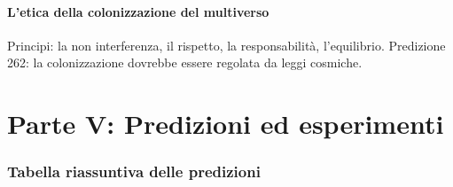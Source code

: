 \documentclass[11pt,a4paper]{article}
\begin{document}
\subsection{L'etica della colonizzazione del multiverso}
Principi: la non interferenza, il rispetto, la responsabilità, l'equilibrio. Predizione 262: la colonizzazione dovrebbe essere regolata da leggi cosmiche.

\newpage
\part*{Parte V: Predizioni ed esperimenti}

\section{Tabella riassuntiva delle predizioni}
\end{document}
